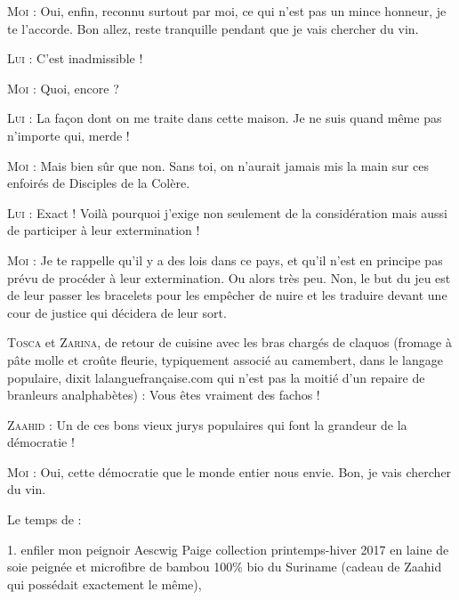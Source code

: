 \begin{dialogue}
\textsc{Moi} : Oui, enfin, reconnu surtout par moi, ce qui n’est pas un mince honneur, je te l’accorde. Bon allez, reste tranquille pendant que je vais chercher du vin.

\textsc{Lui} : C’est inadmissible !

\textsc{Moi} : Quoi, encore ?

\textsc{Lui} : La façon dont on me traite dans cette maison. Je ne suis quand même pas n’importe qui, merde !

\textsc{Moi} : Mais bien sûr que non. Sans toi, on n’aurait jamais mis la main sur ces enfoirés de Disciples de la Colère.

\textsc{Lui} : Exact ! Voilà pourquoi j’exige non seulement de la considération mais aussi de participer à leur extermination !

\textsc{Moi} : Je te rappelle qu’il y a des lois dans ce pays, et qu’il n’est en principe pas prévu de procéder à leur extermination. Ou alors très peu. Non, le but du jeu est de leur passer les bracelets pour les empêcher de nuire et les traduire devant une cour de justice qui décidera de leur sort.

\textsc{Tosca} et \textsc{Zarina}, de retour de cuisine avec les bras chargés de claquos (fromage à pâte molle et croûte fleurie, typiquement associé au camembert, dans le langage populaire, dixit lalanguefrançaise.com qui n’est pas la moitié d’un repaire de branleurs analphabètes) : Vous êtes vraiment des fachos !

\textsc{Zaahid} : Un de ces bons vieux jurys populaires qui font la grandeur de la démocratie !

\textsc{Moi} : Oui, cette démocratie que le monde entier nous envie. Bon, je vais chercher du vin.

\end{dialogue}

Le temps de :

1. enfiler mon peignoir Aescwig Paige collection printemps-hiver 2017 en laine de soie peignée et microfibre de bambou 100\% bio du Suriname (cadeau de Zaahid qui possédait exactement le même),

